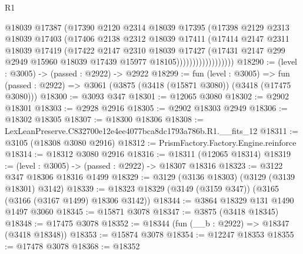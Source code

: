 \begin{lexlean}{R1}
\begin{coremodule}
                            @18039
                            @17387
                            (@17390
                              @2120
                              @2314
                              @18039
                              @17395
                              (@17398
                                @2129
                                @2313
                                @18039
                                @17403
                                (@17406
                                  @2138
                                  @2312
                                  @18039
                                  @17411
                                  (@17414
                                    @2147
                                    @2311
                                    @18039
                                    @17419
                                    (@17422
                                      @2147
                                      @2310
                                      @18039
                                      @17427
                                      (@17431
                                        @2147
                                        @299
                                        @2949
                                        @15960
                                        @18039
                                        @17439
                                        @15977
                                        @18105))))))))))))))))))
@18290 := (level : @3005) -> (passed : @2922) -> @2922
@18299 := fun (level : @3005) =>
  fun (passed : @2922) => @3061 (@3875 (@3418 (@15871 @3080)) (@3418 (@17475 @3080)))
@18300 := @3093 @347
@18301 := @12065 @3080
@18302 := @2902 @18301
@18303 := @2928 @2916
@18305 := @2902 @18303 @2949
@18306 := @18302 @18305
@18307 := @18300 @18306
@18308 := LexLeanPreserve.C832700e12e4ee4077bca8dc1793a786b.R1.__fits_12
@18311 := @3105 (@18308 @3080 @2916)
@18312 := PrismFactory.Factory.Engine.reinforce
@18314 := @18312 @3080 @2916
@18316 := @18311 (@12065 @18314)
@18319 := (level : @3005) -> (passed : @2922) -> @18307 @18316
@18323 := @3122 @347 @18306 @18316 @1499
@18329 := @3129 (@3136 @18303) (@3129 (@3139 @18301) @3142)
@18339 := @18323 @18329 (@3149 (@3159 @347)) (@3165 (@3166 (@3167 @1499) @18306 @3142))
@18344 := @3864 @18329 @131 @1490 @1497 @3060
@18345 := @15871 @3078
@18347 := @3875 (@3418 @18345)
@18348 := @17475 @3078
@18352 := @18344 (fun (__b : @2922) => @18347 (@3418 @18348))
@18353 := @15874 @3078
@18354 := @12247 @18353
@18355 := @17478 @3078
@18368 := @18352

\end{coremodule}
\end{lexlean}

